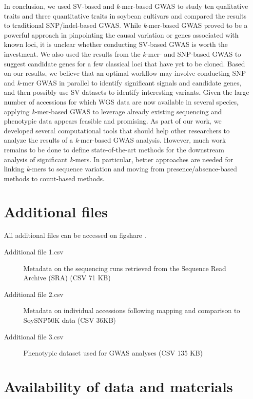 In conclusion, we used SV-based and \emph{k}-mer-based GWAS to study ten
qualitative traits and three quantitative traits in soybean cultivars and
compared the results to traditional SNP/indel-based GWAS. While
\emph{k}-mer-based GWAS proved to be a powerful approach in pinpointing the
causal variation or genes associated with known loci, it is unclear whether
conducting SV-based GWAS is worth the investment. We also used the
results from the \emph{k}-mer- and SNP-based GWAS to suggest candidate genes
for a few classical loci that have yet to be cloned. Based on our results, we
believe that an optimal workflow may involve conducting SNP and \emph{k}-mer
GWAS in parallel to identify significant signals and candidate genes, and then
possibly use SV datasets to identify interesting variants. Given the large
number of accessions for which WGS data are now available in several species,
applying \emph{k}-mer-based GWAS to leverage already existing sequencing and
phenotypic data appears feasible and promising. As part of our work, we
developed several computational tools that should help other researchers to
analyze the results of a \emph{k}-mer-based GWAS analysis. However, much work
remains to be done to define state-of-the-art methods for the downstream
analysis of significant \emph{k}-mers. In particular, better approaches are
needed for linking \emph{k}-mers to sequence variation and moving from
presence/absence-based methods to count-based methods.

\section*{Additional files}
\label{sv-gwas-additional-files}

All additional files can be accessed on figshare \citep{kmer-gwas-figshare}.

\begin{description}
	\item[Additional file 1.csv] Metadata on the sequencing runs retrieved
		from the Sequence Read Archive (SRA) (CSV 71 KB)
	\item[Additional file 2.csv] Metadata on individual accessions following mapping
		and comparison to SoySNP50K data (CSV 36KB)
	\item[Additional file 3.csv] Phenotypic dataset used for GWAS analyses (CSV 135
		KB)
\end{description}

\section*{Availability of data and materials}
\label{sv-gwas-availability}


